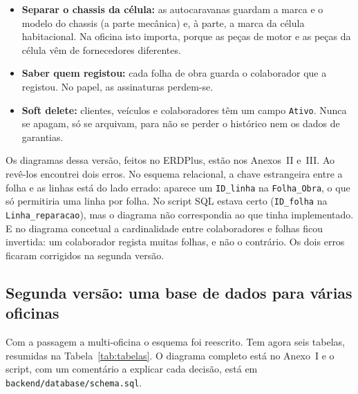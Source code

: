 \documentclass[a4paper,12pt]{article}
\begin{document}
\begin{itemize}
    \item \textbf{Separar o chassis da célula:} as autocaravanas guardam a marca e o modelo do chassis (a parte mecânica) e, à parte, a marca da célula habitacional. Na oficina isto importa, porque as peças de motor e as peças da célula vêm de fornecedores diferentes.
    \item \textbf{Saber quem registou:} cada folha de obra guarda o colaborador que a registou. No papel, as assinaturas perdem-se.
    \item \textbf{Soft delete:} clientes, veículos e colaboradores têm um campo \texttt{Ativo}. Nunca se apagam, só se arquivam, para não se perder o histórico nem os dados de garantias.
\end{itemize}

Os diagramas dessa versão, feitos no ERDPlus, estão nos Anexos~II e~III. Ao revê-los encontrei dois erros. No esquema relacional, a chave estrangeira entre a folha e as linhas está do lado errado: aparece um \texttt{ID\_linha} na \texttt{Folha\_Obra}, o que só permitiria uma linha por folha. No script SQL estava certo (\texttt{ID\_folha} na \texttt{Linha\_reparacao}), mas o diagrama não correspondia ao que tinha implementado. E no diagrama concetual a cardinalidade entre colaboradores e folhas ficou invertida: um colaborador regista muitas folhas, e não o contrário. Os dois erros ficaram corrigidos na segunda versão.

\subsection{Segunda versão: uma base de dados para várias oficinas}

Com a passagem a multi-oficina o esquema foi reescrito. Tem agora seis tabelas, resumidas na Tabela~\ref{tab:tabelas}. O diagrama completo está no Anexo~I e o script, com um comentário a explicar cada decisão, está em \texttt{backend/database/schema.sql}.
\end{document}
